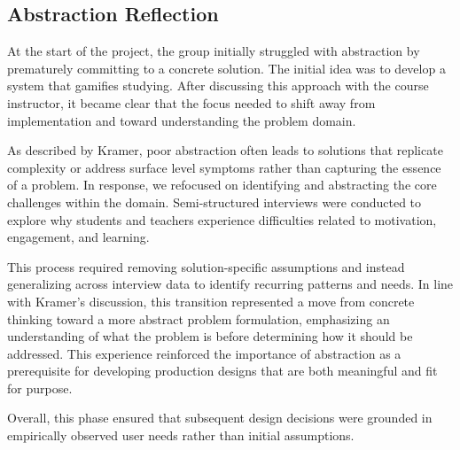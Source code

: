 \subsection{Abstraction Reflection}
At the start of the project,
the group initially struggled with abstraction by prematurely committing to a concrete solution.
The initial idea was to develop a system that gamifies studying. 
After discussing this approach with the course instructor, it became clear that
the focus needed to shift away from implementation and toward understanding the problem domain.

As described by Kramer\cite{AbstractionKey}, poor abstraction often
leads to solutions that replicate complexity or address surface level
symptoms rather than capturing the essence of a problem.
In response, we refocused on identifying and abstracting 
the core challenges within the domain. 
Semi-structured interviews were conducted to explore why students and teachers experience
difficulties related to motivation, engagement, and learning.

This process required removing solution-specific assumptions and instead generalizing across interview data to identify
recurring patterns and needs. 
In line with Kramer’s discussion\cite{AbstractionKey}, this transition represented a move from concrete thinking 
toward a more abstract problem formulation, emphasizing an understanding of what the problem is before determining how it 
should be addressed. 
This experience reinforced the importance of abstraction as a prerequisite for developing production 
designs that are both meaningful and fit for purpose.

Overall, this phase ensured that subsequent design decisions were grounded in empirically observed user needs rather than initial assumptions.


